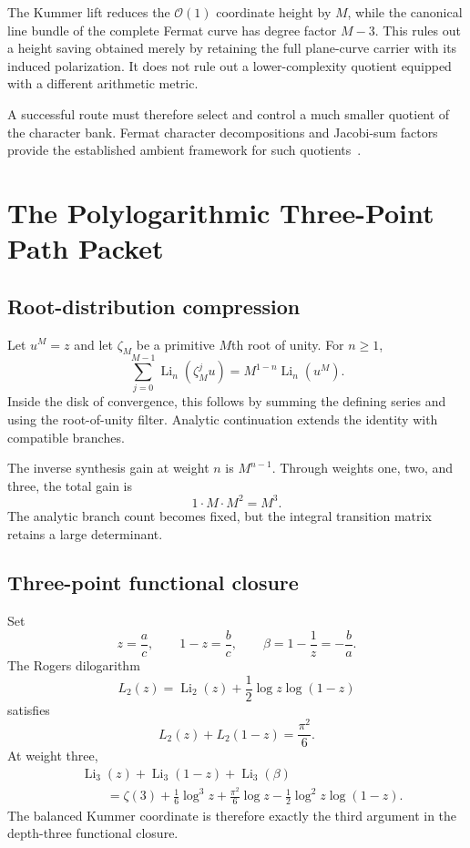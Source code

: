 \begin{proposition}
The Kummer lift reduces the $\mathcal O(1)$ coordinate height by $M$, while the canonical line bundle of the complete Fermat curve has degree factor $M-3$. This rules out a height saving obtained merely by retaining the full plane-curve carrier with its induced polarization. It does not rule out a lower-complexity quotient equipped with a different arithmetic metric.
\end{proposition}

A successful route must therefore select and control a much smaller quotient of the character bank. Fermat character decompositions and Jacobi-sum factors provide the established ambient framework for such quotients~\cite{AokiFermat,OtsuboYamazaki,ColemanMcCallum}.

\chapter{The Polylogarithmic Three-Point Path Packet}

\section{Root-distribution compression}
Let $u^M=z$ and let $\zeta_M$ be a primitive $M$th root of unity. For $n\ge1$,
\[
 \boxed{
 \sum_{j=0}^{M-1}
 \operatorname{Li}_n(\zeta_M^ju)
 =
 M^{1-n}\operatorname{Li}_n(u^M).
 }
\]
Inside the disk of convergence, this follows by summing the defining series and using the root-of-unity filter. Analytic continuation extends the identity with compatible branches.

The inverse synthesis gain at weight $n$ is $M^{n-1}$. Through weights one, two, and three, the total gain is
\[
 \boxed{1\cdot M\cdot M^2=M^3.}
\]
The analytic branch count becomes fixed, but the integral transition matrix retains a large determinant.

\section{Three-point functional closure}
Set
\[
 z=\frac ac,
 \qquad
 1-z=\frac bc,
 \qquad
 \beta=1-\frac1z=-\frac ba.
\]
The Rogers dilogarithm
\[
 L_2(z)
 =
 \operatorname{Li}_2(z)
 +
 \frac12\log z\log(1-z)
\]
satisfies
\[
 \boxed{
 L_2(z)+L_2(1-z)=\frac{\pi^2}{6}.
 }
\]
At weight three,
\[
 \boxed{
 \begin{aligned}
 &\operatorname{Li}_3(z)
 +\operatorname{Li}_3(1-z)
 +\operatorname{Li}_3(\beta)\\
 &\qquad=
 \zeta(3)
 +\frac16\log^3z
 +\frac{\pi^2}{6}\log z
 -\frac12\log^2z\log(1-z).
 \end{aligned}
 }
\]
The balanced Kummer coordinate is therefore exactly the third argument in the depth-three functional closure.

